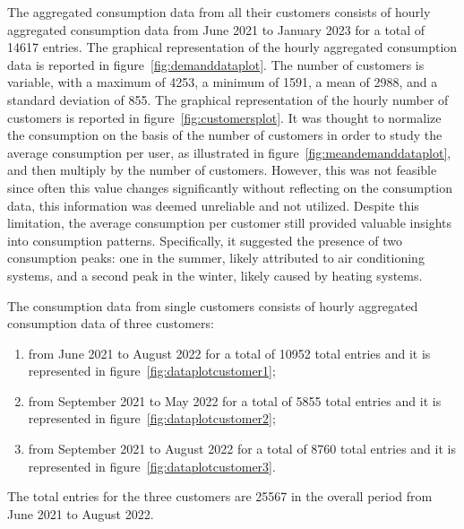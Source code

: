 The aggregated consumption data from all their customers consists of hourly aggregated consumption data from June 2021 to January 2023 for a total of 14617 entries.
The graphical representation of the hourly aggregated consumption data is reported in figure~\ref{fig:demanddataplot}.
The number of customers is variable, with a maximum of 4253, a minimum of 1591, a mean of 2988, and a standard deviation of 855.
The graphical representation of the hourly number of customers is reported in figure~\ref{fig:customersplot}.
It was thought to normalize the consumption on the basis of the number of customers in order to study the average consumption per user, as illustrated in figure~\ref{fig:meandemanddataplot}, and then multiply by the number of customers.
However, this was not feasible since often this value changes significantly without reflecting on the consumption data, this information was deemed unreliable and not utilized.
Despite this limitation, the average consumption per customer still provided valuable insights into consumption patterns.
Specifically, it suggested the presence of two consumption peaks: one in the summer, likely attributed to air conditioning systems, and a second peak in the winter, likely caused by heating systems.

The consumption data from single customers consists of hourly aggregated consumption data of three customers:
\begin{enumerate}
  \item from June 2021 to August 2022 for a total of 10952 total entries and it is represented in figure~\ref{fig:dataplotcustomer1};
  \item from September 2021 to May 2022 for a total of 5855 total entries and it is represented in figure~\ref{fig:dataplotcustomer2};
  \item from September 2021 to August 2022 for a total of 8760 total entries and it is represented in figure~\ref{fig:dataplotcustomer3}.
\end{enumerate}
The total entries for the three customers are 25567 in the overall period from June 2021 to August 2022.

